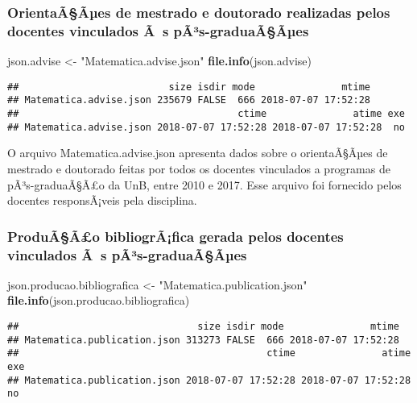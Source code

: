 \documentclass[]{article}
\newenvironment{Shaded}{\begin{snugshade}}{\end{snugshade}}
\newcommand{\KeywordTok}[1]{\textcolor[rgb]{0.13,0.29,0.53}{\textbf{#1}}}
\newcommand{\StringTok}[1]{\textcolor[rgb]{0.31,0.60,0.02}{#1}}
\newcommand{\NormalTok}[1]{#1}
\begin{document}
\subsubsection{OrientaÃ§Ãµes de mestrado e doutorado realizadas pelos
docentes vinculados Ã~s
pÃ³s-graduaÃ§Ãµes}\label{orientaaaes-de-mestrado-e-doutorado-realizadas-pelos-docentes-vinculados-as-pas-graduaaaes}

\begin{Shaded}
\begin{Highlighting}[]
\NormalTok{json.advise <-}\StringTok{ "Matematica.advise.json"}
\KeywordTok{file.info}\NormalTok{(json.advise)}
\end{Highlighting}
\end{Shaded}

\begin{verbatim}
##                          size isdir mode               mtime
## Matematica.advise.json 235679 FALSE  666 2018-07-07 17:52:28
##                                      ctime               atime exe
## Matematica.advise.json 2018-07-07 17:52:28 2018-07-07 17:52:28  no
\end{verbatim}

O arquivo Matematica.advise.json apresenta dados sobre o orientaÃ§Ãµes
de mestrado e doutorado feitas por todos os docentes vinculados a
programas de pÃ³s-graduaÃ§Ã£o da UnB, entre 2010 e 2017. Esse arquivo
foi fornecido pelos docentes responsÃ¡veis pela disciplina.

\subsubsection{ProduÃ§Ã£o bibliogrÃ¡fica gerada pelos docentes
vinculados Ã~s
pÃ³s-graduaÃ§Ãµes}\label{produaao-bibliografica-gerada-pelos-docentes-vinculados-as-pas-graduaaaes}

\begin{Shaded}
\begin{Highlighting}[]
\NormalTok{json.producao.bibliografica <-}\StringTok{ "Matematica.publication.json"}
\KeywordTok{file.info}\NormalTok{(json.producao.bibliografica) }
\end{Highlighting}
\end{Shaded}

\begin{verbatim}
##                               size isdir mode               mtime
## Matematica.publication.json 313273 FALSE  666 2018-07-07 17:52:28
##                                           ctime               atime exe
## Matematica.publication.json 2018-07-07 17:52:28 2018-07-07 17:52:28  no
\end{verbatim}
\end{document}
